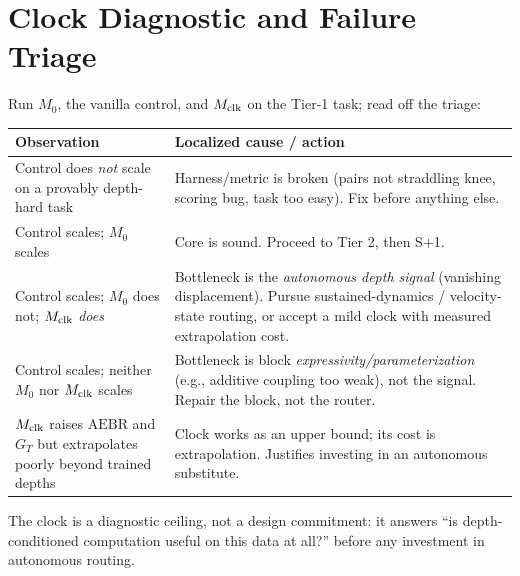 \documentclass[11pt]{article}
\begin{document}
\section{Clock Diagnostic and Failure Triage}
Run $M_0$, the vanilla control, and $M_{\rm clk}$ on the Tier-1 task; read off the triage:
\renewcommand{\arraystretch}{1.2}
\begin{center}\footnotesize
\begin{tabularx}{\textwidth}{@{}L{0.46\textwidth} L{0.46\textwidth}@{}}
\toprule
\textbf{Observation} & \textbf{Localized cause / action} \\
\midrule
Control does \emph{not} scale on a provably depth-hard task & Harness/metric is broken (pairs not straddling knee, scoring bug, task too easy). Fix before anything else. \\
Control scales; $M_0$ scales & Core is sound. Proceed to Tier 2, then S$+$1. \\
Control scales; $M_0$ does not; $M_{\rm clk}$ \emph{does} & Bottleneck is the \emph{autonomous depth signal} (vanishing displacement). Pursue sustained-dynamics / velocity-state routing, or accept a mild clock with measured extrapolation cost. \\
Control scales; neither $M_0$ nor $M_{\rm clk}$ scales & Bottleneck is block \emph{expressivity/parameterization} (e.g., additive coupling too weak), not the signal. Repair the block, not the router. \\
$M_{\rm clk}$ raises $\mathrm{AEBR}$ and $G_T$ but extrapolates poorly beyond trained depths & Clock works as an upper bound; its cost is extrapolation. Justifies investing in an autonomous substitute. \\
\bottomrule
\end{tabularx}
\end{center}
The clock is a diagnostic ceiling, not a design commitment: it answers ``is depth-conditioned computation useful on this data at all?'' before any investment in autonomous routing.

\end{document}
